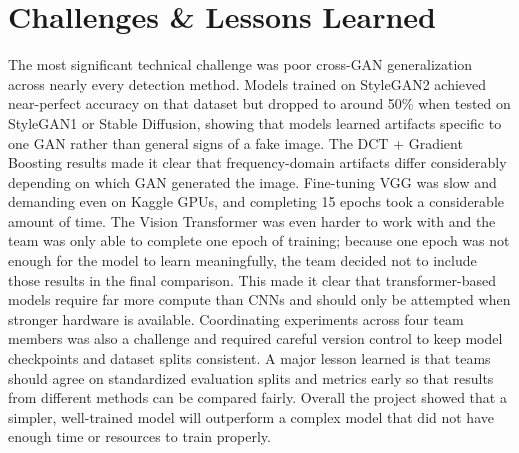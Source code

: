 \documentclass[11pt, letterpaper]{article}
\begin{document}
\section{Challenges \& Lessons Learned}
\begin{tcolorbox}[sectionbox, height=7.2cm, valign=top]
The most significant technical challenge was poor cross-GAN generalization across nearly every detection method. Models trained on StyleGAN2 achieved near-perfect accuracy on that dataset but dropped to around 50\% when tested on StyleGAN1 or Stable Diffusion, showing that models learned artifacts specific to one GAN rather than general signs of a fake image. The DCT + Gradient Boosting results made it clear that frequency-domain artifacts differ considerably depending on which GAN generated the image. Fine-tuning VGG was slow and demanding even on Kaggle GPUs, and completing 15 epochs took a considerable amount of time. The Vision Transformer was even harder to work with and the team was only able to complete one epoch of training; because one epoch was not enough for the model to learn meaningfully, the team decided not to include those results in the final comparison. This made it clear that transformer-based models require far more compute than CNNs and should only be attempted when stronger hardware is available. Coordinating experiments across four team members was also a challenge and required careful version control to keep model checkpoints and dataset splits consistent. A major lesson learned is that teams should agree on standardized evaluation splits and metrics early so that results from different methods can be compared fairly. Overall the project showed that a simpler, well-trained model will outperform a complex model that did not have enough time or resources to train properly.
\end{tcolorbox}

\end{document}
